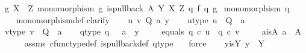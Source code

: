 \begin{isabellebody}
\ {\isachardoublequoteopen}g{\isacharcolon}{\kern0pt}\ X\ {\isasymrightarrow}\ Z{\isachardoublequoteclose}\ {\isachardoublequoteopen}monomorphism\ g{\isachardoublequoteclose}\ {\isachardoublequoteopen}is{\isacharunderscore}{\kern0pt}pullback\ A\ Y\ X\ Z\ q{}\ f\ q{}\ g{\isachardoublequoteclose}\isanewline
{}\ {\isachardoublequoteopen}monomorphism\ q{}{\isachardoublequoteclose}\ \isanewline
%
\isadelimproof
\ \ %
\endisadelimproof
%
\isatagproof
{}\isamarkupfalse%
\ monomorphism{\isacharunderscore}{\kern0pt}def{}\isanewline
{}\isamarkupfalse%
{\isacharparenleft}{\kern0pt}clarify{\isacharparenright}{\kern0pt}\isanewline
\ \ \isamarkupfalse%
\ u\ v\ Q\ a\ y\isanewline
\ \ \isamarkupfalse%
\ u{\isacharunderscore}{\kern0pt}type{\isacharcolon}{\kern0pt}\ {\isachardoublequoteopen}u\ {\isacharcolon}{\kern0pt}\ Q\ {\isasymrightarrow}\ a{\isachardoublequoteclose}\ \ \isanewline
\ \ \isamarkupfalse%
\ v{\isacharunderscore}{\kern0pt}type{\isacharcolon}{\kern0pt}\ {\isachardoublequoteopen}v\ {\isacharcolon}{\kern0pt}\ Q\ {\isasymrightarrow}\ a{\isachardoublequoteclose}\isanewline
\ \ \isamarkupfalse%
\ q{}{\isacharunderscore}{\kern0pt}type{\isacharcolon}{\kern0pt}\ {\isachardoublequoteopen}q{}\ {\isacharcolon}{\kern0pt}\ \ a\ {\isasymrightarrow}\ y{\isachardoublequoteclose}\ \isanewline
\ \ \isamarkupfalse%
\ equals{\isacharcolon}{\kern0pt}\ {\isachardoublequoteopen}q{}\ {\isasymcirc}\isactrlsub c\ u\ {\isacharequal}{\kern0pt}\ q{}\ {\isasymcirc}\isactrlsub c\ v{\isachardoublequoteclose}\ \isanewline
\isanewline
\ \ \isamarkupfalse%
\ a{\isacharunderscore}{\kern0pt}is{\isacharunderscore}{\kern0pt}A{\isacharcolon}{\kern0pt}\ {\isachardoublequoteopen}a\ {\isacharequal}{\kern0pt}\ A{\isachardoublequoteclose}\isanewline
\ \ \ \ \isamarkupfalse%
\ assms{\isacharparenleft}{\kern0pt}{}{\isacharparenright}{\kern0pt}\ cfunc{\isacharunderscore}{\kern0pt}type{\isacharunderscore}{\kern0pt}def\ is{\isacharunderscore}{\kern0pt}pullback{\isacharunderscore}{\kern0pt}def\ q{}{\isacharunderscore}{\kern0pt}type\ \ \isamarkupfalse%
\ force\isanewline
\ \ \isamarkupfalse%
\ y{\isacharunderscore}{\kern0pt}is{\isacharunderscore}{\kern0pt}Y{\isacharcolon}{\kern0pt}\ {\isachardoublequoteopen}y\ {\isacharequal}{\kern0pt}\ Y{\isachardoublequoteclose}\isanewline

\end{isabellebody}
